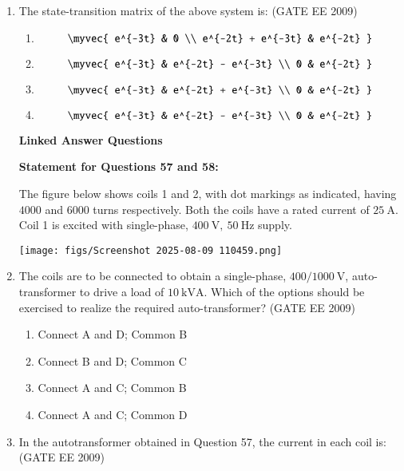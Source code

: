 \documentclass[journal,12pt,onecolumn]{IEEEtran}
\theoremstyle{remark}
\begin{document}
\begin{flushleft}
\begin{enumerate}
\item  The state-transition matrix of the above system is:
\hfill(GATE EE 2009)
\begin{enumerate}
\item \[ \myvec{
e^{-3t} & 0 \\
e^{-2t} + e^{-3t} & e^{-2t} } 
\]
\item \[ \myvec{
e^{-3t} & e^{-2t} - e^{-3t} \\
0 & e^{-2t} }
\]
\item \[\myvec{
e^{-3t} & e^{-2t} + e^{-3t} \\
0 & e^{-2t} } 
\]
\item \[ \myvec{
e^{-3t} & e^{-2t} - e^{-3t} \\
0 & e^{-2t} }
\]
\end{enumerate}



\textbf{Linked Answer Questions}

\textbf{Statement for Questions 57 and 58:}

The figure below shows coils 1 and 2, with dot markings as indicated, having \( 4000 \) and \( 6000 \) turns respectively.  
Both the coils have a rated current of \( 25 \ \mathrm{A} \).  
Coil 1 is excited with single-phase, \( 400 \ \mathrm{V},\ 50 \ \mathrm{Hz} \) supply.

\begin{center}
\texttt{[image: figs/Screenshot 2025-08-09 110459.png]}
\label{fig:placeholder}
\end{center}
 
\item The coils are to be connected to obtain a single-phase, \(400/1000 \ \mathrm{V}\), auto-transformer to drive a load of \(10 \ \mathrm{kVA}\).  
Which of the options should be exercised to realize the required auto-transformer?
\hfill(GATE EE 2009)
\begin{enumerate}
\item Connect A and D; Common B 
\item Connect B and D; Common C 
\item  Connect A and C; Common B 
\item  Connect A and C; Common D
\end{enumerate}


\item In the autotransformer obtained in Question 57, the current in each coil is:
\hfill(GATE EE 2009)
\begin{enumerate}
    

\end{enumerate}
\end{enumerate}
\end{flushleft}
\end{document}
